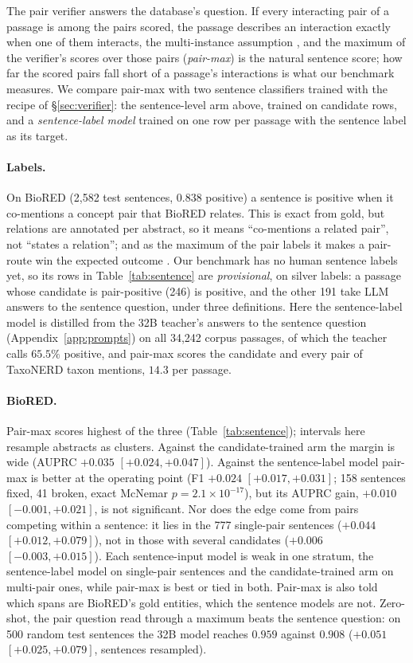 \documentclass[11pt]{article}
\begin{document}
The pair verifier answers the database's question. If every interacting pair of a passage is among
the pairs scored, the passage describes an interaction exactly when one of them interacts, the
multi-instance assumption \citep{dietterich1997solving,hoffmann2011knowledge}, and the maximum of
the verifier's scores over those pairs (\emph{pair-max}) is the natural sentence score; how far the
scored pairs fall short of a passage's interactions is what our benchmark measures. We compare
pair-max with two sentence classifiers trained with the recipe of \S\ref{sec:verifier}: the
sentence-level arm above, trained on candidate rows, and a \emph{sentence-label model} trained on
one row per passage with the sentence label as its target.

\paragraph{Labels.}
On BioRED (2{,}582 test sentences, $0.838$ positive) a sentence is positive when it co-mentions a
concept pair that BioRED relates. This is exact from gold, but relations are annotated per abstract,
so it means ``co-mentions a related pair'', not ``states a relation''; and as the maximum of the
pair labels it makes a pair-route win the expected outcome \citep[cf.][]{li2021dual}. Our benchmark has no
human sentence labels yet, so its rows in Table~\ref{tab:sentence} are \emph{provisional}, on silver
labels: a passage whose candidate is pair-positive (246) is positive, and the other 191 take LLM
answers to the sentence question, under three definitions. Here the sentence-label model is
distilled from the 32B teacher's answers to the sentence question (Appendix~\ref{app:prompts}) on
all 34{,}242 corpus passages, of which the teacher calls $65.5\%$ positive, and pair-max scores the candidate
and every pair of TaxoNERD taxon mentions, $14.3$ per passage.

\paragraph{BioRED.}
Pair-max scores highest of the three (Table~\ref{tab:sentence}); intervals here resample abstracts
as clusters. Against the candidate-trained arm the margin is wide (AUPRC $+0.035$
$[+0.024, +0.047]$). Against the sentence-label model pair-max is better at the operating point (F1
$+0.024$ $[+0.017, +0.031]$; 158 sentences fixed, 41 broken, exact McNemar $p = 2.1\times10^{-17}$),
but its AUPRC gain, $+0.010$ $[-0.001, +0.021]$, is not significant. Nor does the edge come from
pairs competing within a sentence: it lies in the 777 single-pair sentences ($+0.044$
$[+0.012, +0.079]$), not in those with several candidates ($+0.006$ $[-0.003, +0.015]$). Each
sentence-input model is weak in one stratum, the sentence-label model on single-pair sentences and
the candidate-trained arm on multi-pair ones, while pair-max is best or tied in both. Pair-max is also told which spans are BioRED's gold
entities, which the sentence models are not. Zero-shot, the pair question read through a maximum
beats the sentence question: on 500 random test sentences the 32B model reaches $0.959$ against
$0.908$ ($+0.051$ $[+0.025, +0.079]$, sentences resampled).
\end{document}
